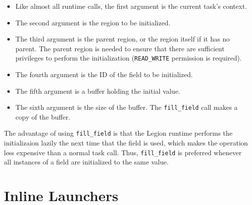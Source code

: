 \begin{itemize}

\item Like almost all runtime calls, the first argument is the current task's context.

\item The second argument is the region to be initialized.

\item The third argument is the parent region, or the region itself if it has no parent.  The parent region is needed
to ensure that there are sufficient privileges to perform the initialization ({\tt READ\_WRITE} permission
is required).

\item The fourth argument is the ID of the field to be initialized.

\item The fifth argument is a buffer holding the initial value.

\item The sixth argument is the size of the buffer.  
The {\tt fill\_field} call makes a copy of the buffer.

\end{itemize}

The advantage of using {\tt fill\_field} is that the Legion runtime performs the initializaion lazily the next time that
the field is used, which makes the operation less expensive than a normal task call.  Thus, {\tt fill\_field} is preferred
whenever all instances of a field are initialized to the same value.


\section{Inline Launchers}
\label{sec:inlinelaunch}

